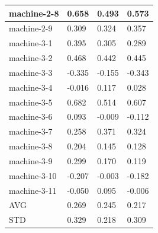 \begin{table}[]
\begin{tabular}{|l|l|l|l|}
			machine-2-8     & 0.658                        & 0.493                        & 0.573                         \\ \hline
			machine-2-9     & 0.309                        & 0.324                        & 0.357                         \\ \hline
			machine-3-1     & 0.395                        & 0.305                        & 0.289                         \\ \hline
			machine-3-2     & 0.468                        & 0.442                        & 0.445                         \\ \hline
			machine-3-3     & -0.335                       & -0.155                       & -0.343                        \\ \hline
			machine-3-4     & -0.016                       & 0.117                        & 0.028                         \\ \hline
			machine-3-5     & 0.682                        & 0.514                        & 0.607                         \\ \hline
			machine-3-6     & 0.093                        & -0.009                       & -0.112                        \\ \hline
			machine-3-7     & 0.258                        & 0.371                        & 0.324                         \\ \hline
			machine-3-8     & 0.204                        & 0.145                        & 0.128                         \\ \hline
			machine-3-9     & 0.299                        & 0.170                        & 0.119                         \\ \hline
			machine-3-10    & -0.207                       & -0.003                       & -0.182                        \\ \hline
			machine-3-11    & -0.050                       & 0.095                        & -0.006                        \\ \hline
			AVG             & 0.269                        & 0.245                        & 0.217                         \\ \hline
			STD             & 0.329                        & 0.218                        & 0.309                         \\ \hline
		\end{tabular}%
	
\end{table}

